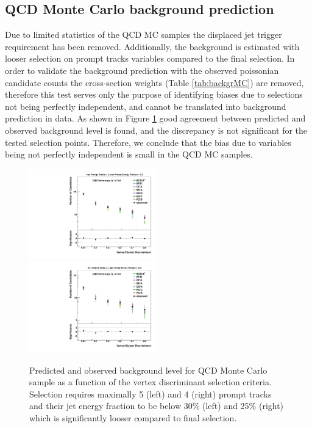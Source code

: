 \subsection{QCD Monte Carlo background prediction}
\label{subsec:bkgQCDMC}

Due to limited statistics of the QCD MC samples the displaced jet trigger requirement has been removed. Additionally, the background is estimated with looser
 selection on prompt tracks variables compared to the final selection. 
In order to validate the background prediction with 
the observed poissonian candidate counts the cross-section weights (Table \ref{tab:backgrMC}) 
are removed, 
therefore this test serves only the purpose of identifying biases due to selections not being
perfectly independent, and cannot be translated
into background prediction in data.  
As shown in Figure \ref{fig:bkg_MC} good agreement between predicted and observed background level is found, 
and the discrepancy is not significant for the tested selection points. Therefore, we conclude that the  
bias due to variables being not perfectly independent is small in the QCD MC samples. 

\begin{figure}[htbp]
  \centering
  \includegraphics[width=0.495\textwidth]{plots/background/bkg_MC1.pdf}
  \includegraphics[width=0.495\textwidth]{plots/background/bkg_MC2.pdf}
  \caption{Predicted and observed background level for QCD Monte Carlo sample as a function of the vertex discriminant selection criteria.
Selection requires maximally 5 (left) and 4 (right)  prompt tracks and their jet energy fraction to be below 30\% (left) and 25\% (right) which
is significantly looser compared to final selection. \label{fig:bkg_MC}}
  \end{figure}


